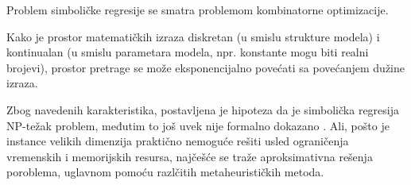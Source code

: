 \documentclass[main.tex]{subfiles}
\begin{document}
Problem simboličke regresije se smatra problemom kombinatorne optimizacije.

Kako je prostor matematičkih izraza diskretan (u smislu strukture modela) i kontinualan (u smislu parametara modela, npr. konstante mogu biti realni brojevi), prostor pretrage se može eksponencijalno povećati sa povećanjem dužine izraza.

Zbog navedenih karakteristika, postavljena je hipoteza da je simbolička regresija NP-težak problem, međutim to još uvek nije formalno dokazano \cite{np-hard1, np-hard2}. Ali, pošto je instance velikih dimenzija praktično nemoguće rešiti usled ograničenja vremenskih i memorijskih resursa, najčešće se traže aproksimativna rešenja poroblema, uglavnom pomoću razlčitih metaheurističkih metoda.
\end{document}
